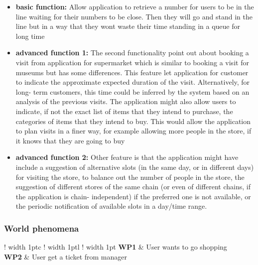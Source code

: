 \begin{itemize}
\item \textbf{basic function:} Allow application to retrieve a number for users to be in the line waiting for their numbers to be close. Then they will go and stand in the line but in a way that they wont waste their time standing in a queue for long time
\item \textbf{advanced function 1:} The second functionality point out about booking a visit from application for supermarket which is similar to booking a visit for museums but has some differences. This feature let application for customer to indicate the approximate expected duration of the visit. Alternatively, for long- 
term customers, this time could be inferred by the system based on an analysis of the previous visits.  
The application might also allow users to indicate, if not the exact list of items that they intend to  
purchase, the categories of items that they intend to buy. This would allow the application to plan visits  
in a finer way, for example allowing more people in the store, if it knows that they are going to buy
\item \textbf{advanced function 2:} Other feature is that the application might have include a suggestion of alternative slots (in the same  
day, or in different days) for visiting the store, to balance out the number of people in the store, the  
suggestion of different stores of the same chain (or even of different chains, if the application is chain- 
independent) if the preferred one is not available, or the periodic notification of available slots in a  
day/time range.
\end{itemize}


\subsubsection{World phenomena}
\newcommand{\Vline}{\color{lightBlueBorder} \vrule width 1pt}
\def\arraystretch{1.5}

\setlength\arrayrulewidth{1pt}
\setlength\LTleft{0pt}

\begin{longtable}{!\Vline c !\Vline l !\Vline} 
    \hline
    \textbf{WP1} & User wants to go shopping  \\
    \textbf{WP2} & User get a ticket from manager  \\  \hline
\end{longtable}

